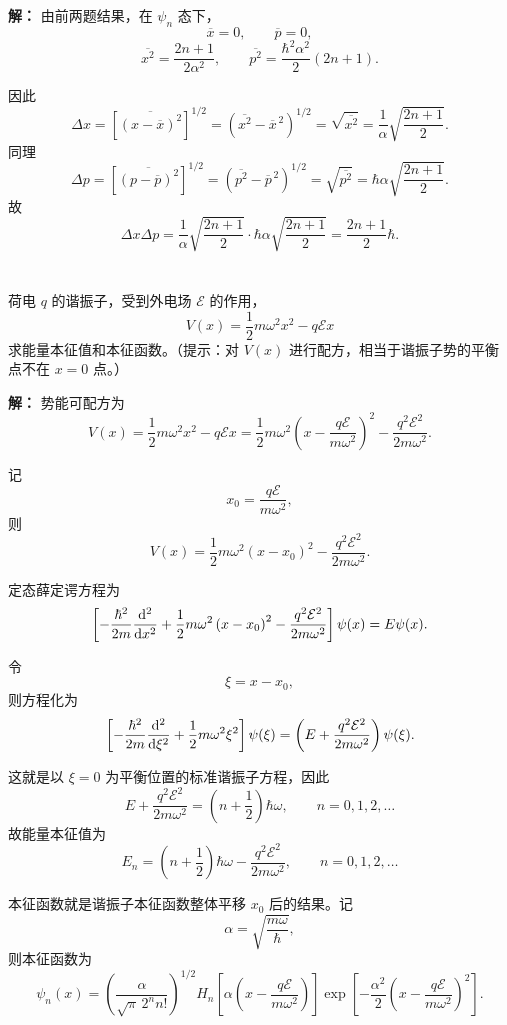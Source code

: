 \documentclass[10pt,a4paper]{article}
\begin{document}
\vspace{0.5cm}

\noindent\textbf{解：}
由前两题结果，在 \(\psi_n\) 态下，
\[
\overline{x}=0,
\qquad
\overline{p}=0,
\]
\[
\overline{x^2}=\frac{2n+1}{2\alpha^2},
\qquad
\overline{p^2}=\frac{\hbar^2\alpha^2}{2}\left(2n+1\right).
\]

因此
\[
\Delta x=\left[\overline{\left(x-\overline{x}\right)^2}\right]^{1/2}
=\left(\overline{x^2}-\overline{x}^{\,2}\right)^{1/2}
=\sqrt{\overline{x^2}}
=\frac{1}{\alpha}\sqrt{\frac{2n+1}{2}}.
\]
同理
\[
\Delta p=\left[\overline{\left(p-\overline{p}\right)^2}\right]^{1/2}
=\left(\overline{p^2}-\overline{p}^{\,2}\right)^{1/2}
=\sqrt{\overline{p^2}}
=\hbar\alpha\sqrt{\frac{2n+1}{2}}.
\]
故
\[
\Delta x\Delta p
=
\frac{1}{\alpha}\sqrt{\frac{2n+1}{2}}
\cdot
\hbar\alpha\sqrt{\frac{2n+1}{2}}
=
\frac{2n+1}{2}\hbar.
\]

\section{}
荷电 $q$ 的谐振子，受到外电场 $\mathcal{E}$ 的作用，
\[
V(x)=\frac{1}{2}m\omega^2x^2-q\mathcal{E}x
\]
求能量本征值和本征函数。（提示：对 $V(x)$ 进行配方，相当于谐振子势的平衡点不在 $x=0$ 点。）

\vspace{0.5cm}

\noindent\textbf{解：}
势能可配方为
\[
V(x)
=
\frac{1}{2}m\omega^2x^2-q\mathcal{E}x
=
\frac{1}{2}m\omega^2\left(x-\frac{q\mathcal{E}}{m\omega^2}\right)^2
-\frac{q^2\mathcal{E}^2}{2m\omega^2}.
\]

记
\[
x_0=\frac{q\mathcal{E}}{m\omega^2},
\]
则
\[
V(x)=\frac{1}{2}m\omega^2\left(x-x_0\right)^2-\frac{q^2\mathcal{E}^2}{2m\omega^2}.
\]

定态薛定谔方程为
\[
\left[
-\frac{\hbar^2}{2m}\dv[2]{}{x}
+\frac{1}{2}m\omega^2\left(x-x_0\right)^2
-\frac{q^2\mathcal{E}^2}{2m\omega^2}
\right]\psi(x)
=
E\psi(x).
\]

令
\[
\xi=x-x_0,
\]
则方程化为
\[
\left[
-\frac{\hbar^2}{2m}\dv[2]{}{\xi}
+\frac{1}{2}m\omega^2\xi^2
\right]\psi(\xi)
=
\left(
E+\frac{q^2\mathcal{E}^2}{2m\omega^2}
\right)\psi(\xi).
\]

这就是以 \(\xi=0\) 为平衡位置的标准谐振子方程，因此
\[
E+\frac{q^2\mathcal{E}^2}{2m\omega^2}
=
\left(n+\frac{1}{2}\right)\hbar\omega,
\qquad
n=0,1,2,\dots
\]
故能量本征值为
\[
E_n
=
\left(n+\frac{1}{2}\right)\hbar\omega
-\frac{q^2\mathcal{E}^2}{2m\omega^2},
\qquad
n=0,1,2,\dots
\]

本征函数就是谐振子本征函数整体平移 \(x_0\) 后的结果。记
\[
\alpha=\sqrt{\frac{m\omega}{\hbar}},
\]
则本征函数为
\[
\psi_n(x)
=
\left(\frac{\alpha}{\sqrt{\pi}\,2^n n!}\right)^{1/2}
H_n\left[\alpha\left(x-\frac{q\mathcal{E}}{m\omega^2}\right)\right]
\exp\left[
-\frac{\alpha^2}{2}
\left(x-\frac{q\mathcal{E}}{m\omega^2}\right)^2
\right].
\]
\end{document}
